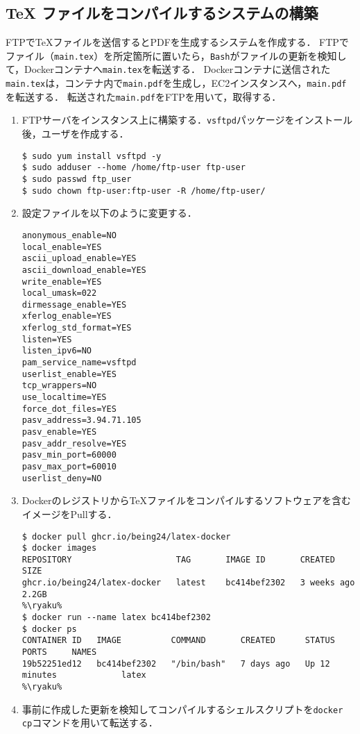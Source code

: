 \subsection{{\normalfont \TeX} ファイルをコンパイルするシステムの構築}
FTPで\TeX ファイルを送信するとPDFを生成するシステムを作成する．
FTPでファイル（\texttt{main.tex}）を所定箇所に置いたら，\texttt{Bash}がファイルの更新を検知して，Dockerコンテナへ\texttt{main.tex}を転送する．
Dockerコンテナに送信された\texttt{main.tex}は，コンテナ内で\texttt{main.pdf}を生成し，EC2インスタンスへ，\texttt{main.pdf}を転送する．
転送された\texttt{main.pdf}をFTPを用いて，取得する．
\begin{enumerate}
    \item FTPサーバをインスタンス上に構築する．\texttt{vsftpd}パッケージをインストール後，ユーザを作成する．
          \begin{lstlisting}
$ sudo yum install vsftpd -y
$ sudo adduser --home /home/ftp-user ftp-user
$ sudo passwd ftp_user
$ sudo chown ftp-user:ftp-user -R /home/ftp-user/
\end{lstlisting}
    \item 設定ファイルを以下のように変更する．
          \begin{lstlisting}[style=file,caption={\ttfamily /etc/vsftpd/vsftpd.conf}]
anonymous_enable=NO
local_enable=YES
ascii_upload_enable=YES
ascii_download_enable=YES
write_enable=YES
local_umask=022
dirmessage_enable=YES
xferlog_enable=YES
xferlog_std_format=YES
listen=YES
listen_ipv6=NO
pam_service_name=vsftpd
userlist_enable=YES
tcp_wrappers=NO
use_localtime=YES
force_dot_files=YES
pasv_address=3.94.71.105
pasv_enable=YES
pasv_addr_resolve=YES
pasv_min_port=60000
pasv_max_port=60010
userlist_deny=NO    
\end{lstlisting}
    \item Dockerのレジストリから\TeX ファイルをコンパイルするソフトウェアを含むイメージをPullする．
          \begin{lstlisting}
$ docker pull ghcr.io/being24/latex-docker
$ docker images
REPOSITORY                     TAG       IMAGE ID       CREATED       SIZE
ghcr.io/being24/latex-docker   latest    bc414bef2302   3 weeks ago   2.2GB
%\ryaku%
$ docker run --name latex bc414bef2302
$ docker ps
CONTAINER ID   IMAGE          COMMAND       CREATED      STATUS          PORTS     NAMES
19b52251ed12   bc414bef2302   "/bin/bash"   7 days ago   Up 12 minutes             latex
%\ryaku%
\end{lstlisting}
    \item 事前に作成した更新を検知してコンパイルするシェルスクリプトを\texttt{docker cp}コマンドを用いて転送する．

\end{enumerate}
